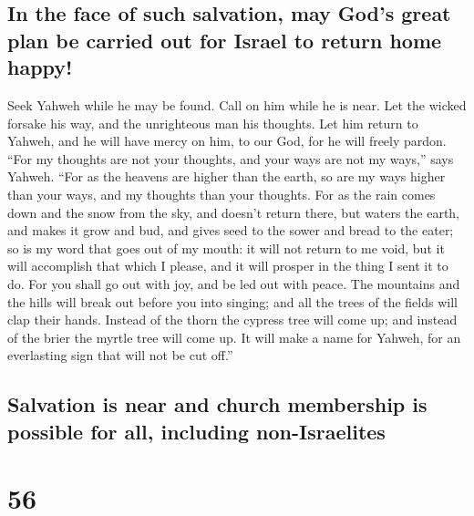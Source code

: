 \hypertarget{in-the-face-of-such-salvation-may-gods-great-plan-be-carried-out-for-israel-to-return-home-happy}{%
\subsection{In the face of such salvation, may God's great plan be
carried out for Israel to return home
happy!}\label{in-the-face-of-such-salvation-may-gods-great-plan-be-carried-out-for-israel-to-return-home-happy}}

 Seek Yahweh while he may be found. Call on him while he
is near.  Let the wicked forsake his way, and the
unrighteous man his thoughts. Let him return to Yahweh, and he will have
mercy on him, to our God, for he will freely pardon. 
``For my thoughts are not your thoughts, and your ways are not my
ways,'' says Yahweh.  ``For as the heavens are higher than
the earth, so are my ways higher than your ways, and my thoughts than
your thoughts.  For as the rain comes down and the snow
from the sky, and doesn't return there, but waters the earth, and makes
it grow and bud, and gives seed to the sower and bread to the eater;
 so is my word that goes out of my mouth: it will not
return to me void, but it will accomplish that which I please, and it
will prosper in the thing I sent it to do.  For you shall
go out with joy, and be led out with peace. The mountains and the hills
will break out before you into singing; and all the trees of the fields
will clap their hands.  Instead of the thorn the cypress
tree will come up; and instead of the brier the myrtle tree will come
up. It will make a name for Yahweh, for an everlasting sign that will
not be cut off.''

\hypertarget{salvation-is-near-and-church-membership-is-possible-for-all-including-non-israelites}{%
\subsection{Salvation is near and church membership is possible for all,
including
non-Israelites}\label{salvation-is-near-and-church-membership-is-possible-for-all-including-non-israelites}}

\hypertarget{section-55}{%
\section{56}\label{section-55}}

